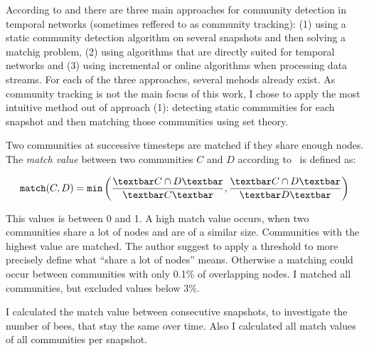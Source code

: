 According to \textcite{aynaud2013communities} and \textcite{brodka2014community} there are three main approaches for community detection in temporal networks (sometimes reffered to as community tracking): (1) using a static community detection algorithm on several snapshots and then solving a matchig problem, (2) using algorithms that are directly suited for temporal networks and (3) using incremental or online algorithms when processing data streams. For each of the three approaches, several mehods already exist.
As community tracking is not the main focus of this work, I chose to apply the most intuitive method out of approach (1): detecting static communities for each snapshot and then matching those communities using set theory.

Two communities at successive timesteps are matched if they share enough nodes. The \emph{match value} between two communities $C$ and $D$ according to~\textcite{hopcroft2004tracking} is defined as:

\begin{equation}
\label{eq:match}
\texttt{match}(C,D) = \texttt{min}\left( \frac{\textbar C\cap D \textbar}{\textbar C\textbar }, \frac{\textbar C\cap D \textbar}{\textbar D \textbar }\right)
\end{equation}

This values is between 0 and 1. A high match value occurs, when two communities share a lot of nodes and are of a similar size. Communities with the highest value are matched. The author suggest to apply a threshold to more precisely define what ``share a lot of nodes'' means. Otherwise a matching could occur between communities with only 0.1\% of overlapping nodes. I matched all communities, but excluded values below 3\%.

I calculated the match value between consecutive snapshots, to investigate the number of bees, that stay the same over time. Also I calculated all match values of all communities per snapshot.